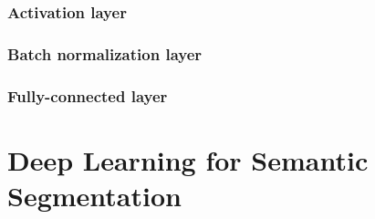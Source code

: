 \subsubsection{Activation layer}

\subsubsection{Batch normalization layer}

\subsubsection{Fully-connected layer}

\section{Deep Learning for Semantic Segmentation}

